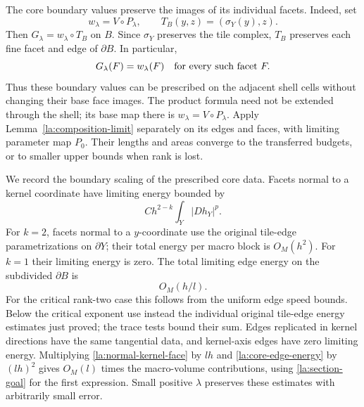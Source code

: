 \documentclass[11pt]{article}
\numberwithin{equation}{section}
\theoremstyle{definition}
\theoremstyle{remark}
\begin{document}
The core boundary values preserve the images of its individual facets.
Indeed, set
\[
 w_\lambda=V\circ P_\lambda,\qquad
 T_B(y,z)=(\sigma_Y(y),z).
\]
Then $G_\lambda=w_\lambda\circ T_B$ on $B$.  Since $\sigma_Y$ preserves
the tile complex, $T_B$ preserves each fine facet and edge of
$\partial B$.  In particular,
\[
 G_\lambda(F)=w_\lambda(F)
 \quad\hbox{for every such facet }F.
\]
Thus these boundary values can be prescribed on the adjacent shell
cells without changing their base face images.  The product formula
need not be extended through the shell; its base map there is
$w_\lambda=V\circ P_\lambda$.
Apply Lemma~\ref{la:composition-limit} separately on its edges and
faces, with limiting parameter map $P_0$.  Their lengths and areas
converge to the transferred budgets, or to smaller upper bounds
when rank is lost.

We record the boundary scaling of the prescribed core data.  Facets
normal to a kernel coordinate have limiting energy bounded by
\begin{equation}\label{la:normal-kernel-face}
 C h^{2-k}\int_Y|Dh_Y|^p.
\end{equation}
For $k=2$, facets normal to a $y$-coordinate use the original tile-edge
parametrizations on $\partial Y$; their total energy per macro block
is $O_M(h^2)$.  For $k=1$ their limiting energy is zero.  The total
limiting edge energy on the subdivided $\partial B$ is
\begin{equation}\label{la:core-edge-energy}
 O_M(h/l).
\end{equation}
For the critical rank-two case this follows from the uniform edge
speed bounds.  Below the critical exponent use instead the
individual original tile-edge energy estimates just proved; the
trace tests bound their sum.  Edges replicated in kernel directions
have the same tangential data, and kernel-axis edges have zero
limiting energy.  Multiplying \eqref{la:normal-kernel-face} by $lh$
and \eqref{la:core-edge-energy} by $(lh)^2$ gives
$O_M(l)$ times the macro-volume contributions, using
\eqref{la:section-goal} for the first expression.  Small positive
$\lambda$ preserves these estimates with arbitrarily small error.
\end{document}
